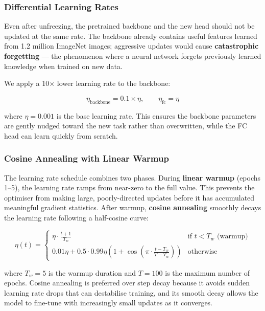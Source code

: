 \documentclass[12pt, a4paper]{article}
\begin{document}
\subsubsection{Differential Learning Rates}

Even after unfreezing, the pretrained backbone and the new head should not be
updated at the same rate.  The backbone already contains useful features learned
from 1.2 million ImageNet images; aggressive updates would cause
\textbf{catastrophic forgetting} --- the phenomenon where a neural network
forgets previously learned knowledge when trained on new data.

We apply a 10$\times$ lower learning rate to the backbone:

\begin{equation}
\eta_{\text{backbone}} = 0.1 \times \eta, \qquad \eta_{\text{fc}} = \eta
\end{equation}

where $\eta = 0.001$ is the base learning rate.  This ensures the backbone
parameters are gently nudged toward the new task rather than overwritten, while
the FC head can learn quickly from scratch.

\subsubsection{Cosine Annealing with Linear Warmup}

The learning rate schedule combines two phases.  During \textbf{linear warmup}
(epochs 1--5), the learning rate ramps from near-zero to the full value.  This
prevents the optimiser from making large, poorly-directed updates before it has
accumulated meaningful gradient statistics.  After warmup, \textbf{cosine
annealing} smoothly decays the learning rate following a half-cosine curve:

\begin{equation}
\eta(t) =
\begin{cases}
\eta \cdot \frac{t+1}{T_w} & \text{if } t < T_w \text{ (warmup)} \\[4pt]
0.01\eta + 0.5 \cdot 0.99\eta \left(1 + \cos\left(\pi \cdot \frac{t - T_w}{T - T_w}\right)\right) & \text{otherwise}
\end{cases}
\label{eq:lr_schedule}
\end{equation}

where $T_w = 5$ is the warmup duration and $T = 100$ is the maximum number of
epochs.  Cosine annealing is preferred over step decay because it avoids sudden
learning rate drops that can destabilise training, and its smooth decay allows
the model to fine-tune with increasingly small updates as it converges.
\end{document}
